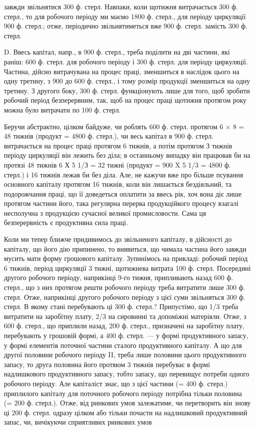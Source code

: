 завжди звільнятися 300 ф. стерл. Навпаки, коли щотижня витрачається
300 ф. стерл., то для робочого періоду ми маємо 1800 ф. стерл., для періоду
циркуляції 900 ф. стерл.; отже, періодично звільнятиметься вже 900 ф. стерл.
замість 300 ф. стерл.

D. Ввесь капітал, напр., в 900 ф. стерл., треба поділити на дві частини,
які раніш: 600 ф. стерл. для робочого періоду і 300 ф. стерл. для періоду
циркуляції. Частина, дійсно витрачувана на процес праці, зменшиться в
наслідок цього на одну третину, з 900 до 600 ф. стерл., і тому розмір продукції
зменшиться на одну третину. З другого боку, 300 ф. стерл.
функціонують лише для того, щоб зробити робочий період безперервним,
так, щоб на процес праці щотижня протягом року можна було витрачати
по 100 ф. стерл.

Беручи абстрактно, цілком байдуже, чи роблять 600 ф. стерл. протягом
6 × 8 = 48 тижнів (продукт = 4800 ф. стерл.), чи весь капітал в 900 ф. стерл.
витрачається на процес праці протягом 6 тижнів, а потім протягом
З тижнів періоду циркуляції він лежить без діла; в останньому випадку
він працював би на протязі 48 тижнів 6 Х 5 1/З = 32 тижні (продукт =
900 X 5 1/3 = 4800 ф. стерл.) і 16 тижнів лежав би без діла. Але, не кажучи
вже про більше псування основного капіталу протягом 16 тижнів, коли
він лишається бездіяльний, та подорожчання праці, що її доведеться оплатити
за ввесь рік, хоч вона діє лише протягом частини його, така регулярна
перерва продукційкого процесу взагалі несполучна з продукцією
сучасної великої промисловости. Сама ця безперервність є продуктивна
сила праці.

Коли ми тепер ближче придивимось до звільненого капіталу, в дійсності
до капіталу, що його дію припинено, то виявиться, що чимала
частина його завжди мусить мати форму грошового капіталу. Зупинімось
на прикладі: робочий період 6 тижнів, період циркуляції 3 тижні, щотижнева
витрата 100 ф. стерл. Посередині другого робочого періоду,
наприкінці 9-го тижня, припливають назад 600 ф. стерл., що з них протягом
решти робочого періоду треба витратити лише 300 ф. стерл.
Отже, наприкінці другого робочого періоду з цієї суми звільняться
300 ф. стерл. В якому стані перебувають ці 300 ф. стерл.? Припустімо,
що 1/3 треба витратити на заробітну плату, 2/3 на сировинні та допоміжні
матеріяли. Отже, з 600 ф. стерл., що приплили назад, 200 ф. стерл., призначені
на заробітну плату, перебувають у грошовій формі, а 400 ф.
стерл. — у формі продуктивного запасу, у формі елементів поточної
частини сталого продуктивного капіталу. А що для другої половини
робочого періоду II, треба лише половини цього продуктивного запасу,
то друга половина його протяюм 3 тижнів перебуває в формі надлишкового
продуктивного запасу, тобто запасу, що перевищує потреби одного
робочого періоду. Але капіталіст знає, що з цієї частини (= 400 ф. стерл.)
приплилого капіталу для поточного робочого періоду потрібна тільки
половина (= 200 ф. стерл.). Отже, від ринкових умов залежатиме, чи
перетворить він знову ці 200 ф. стерл. одразу цілком або тільки почасти на
надлишковий продуктивний запас, чи, вичікуючи сприятливих ринкових умов
